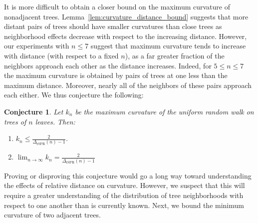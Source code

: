 \documentclass{amsart}
\newtheorem{conjecture}[theorem]{Conjecture}
\begin{document}
It is more difficult to obtain a closer bound on the maximum curvature of nonadjacent trees.
Lemma~\ref{lem:curvature_distance_bound} suggests that more distant pairs of trees should have smaller curvatures than close trees as neighborhood effects decrease with respect to the increasing distance.
However, our experiments with $n \le 7$ suggest that maximum curvature tends to increase with distance (with respect to a fixed $n$), as a far greater fraction of the neighbors approach each other as the distance increases.
Indeed, for $5 \le n \le 7$ the maximum curvature is obtained by pairs of trees at one less than the maximum distance.
Moreover, nearly all of the neighbors of these pairs approach each either.
We thus conjecture the following:
\begin{conjecture}
	Let $k_n$ be the maximum curvature of the uniform random walk on trees of $n$ leaves.
	Then:
	\begin{enumerate}
		\item $k_n \le \frac{2}{\Delta_{\text{rSPR}}(n)-1}$.
		\item $\lim_{n\rightarrow\infty} k_n  = \frac{2}{\Delta_{\text{rSPR}}(n)-1}$
	\end{enumerate}
\end{conjecture}
Proving or disproving this conjecture would go a long way toward understanding the effects of relative distance on curvature.
However, we suspect that this will require a greater understanding of the distribution of tree neighborhoods with respect to one another than is currently known.
Next, we bound the minimum curvature of two adjacent trees.
\end{document}

